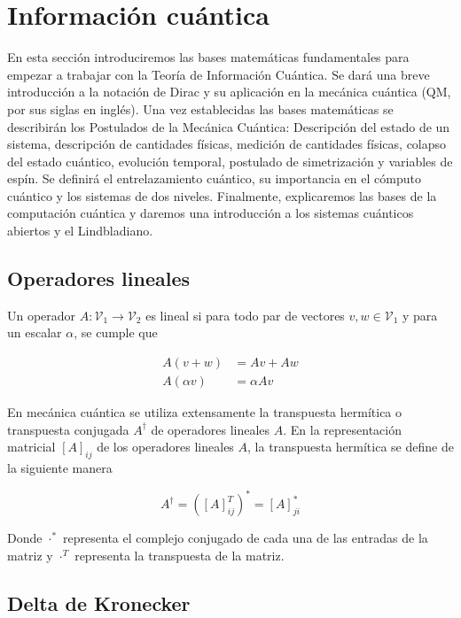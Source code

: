 \chapter{Información cuántica}

En esta sección introduciremos las bases matemáticas fundamentales para empezar a trabajar con la Teoría de Información Cuántica. Se dará una breve introducción a la notación de Dirac y su aplicación en la mecánica cuántica (QM, por sus siglas en inglés). Una vez establecidas las bases matemáticas se describirán los Postulados de la Mecánica Cuántica: Descripción del estado de un sistema, descripción de cantidades físicas, medición de cantidades físicas, colapso del estado cuántico, evolución temporal, postulado de simetrización y variables de espín. Se definirá el entrelazamiento cuántico, su importancia en el cómputo cuántico y los sistemas de dos niveles. Finalmente, explicaremos las bases de la computación cuántica y daremos una introducción a los sistemas cuánticos abiertos y el Lindbladiano.

\section{Operadores lineales}

Un operador $A: \mathcal{V}_1 \rightarrow \mathcal{V}_2$ es lineal si para todo par de vectores $v, w \in \mathcal{V}_1$ y para un escalar $\alpha$, se cumple que

\begin{align}
    A (v + w) &= A v + A w \\
    A (\alpha v) &= \alpha A v
\end{align}

En mecánica cuántica se utiliza extensamente la transpuesta hermítica o transpuesta conjugada $A^\dagger$ de operadores lineales $A$. En la representación matricial $[A]_{ij}$ de los operadores lineales $A$, la transpuesta hermítica se define de la siguiente manera

\begin{equation}
    A^\dagger = ([A]_{ij}^T)^* = [A]_{ji}^*
\end{equation}

Donde $\cdot^*$ representa el complejo conjugado de cada una de las entradas de la matriz y $\cdot^T$ representa la transpuesta de la matriz.

\section{Delta de Kronecker}

